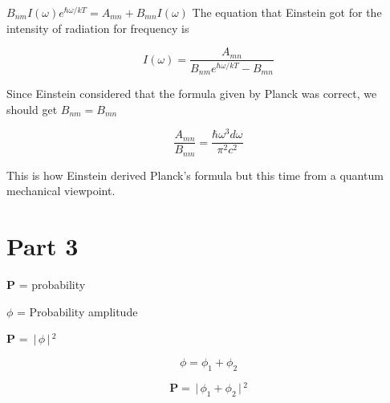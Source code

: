 \documentclass[aspectratio=169]{beamer}
\begin{document}
\begin{frame}{}

	\begin{center}

		 $ B_{nm} I(\omega) e^{\hbar \omega /kT} = A_{mn} + B_{mn} I(\omega) $ \pause \newline
		 The equation that Einstein got for the intensity of radiation for frequency is 
		
	\end{center}
	
		\begin{equation}
				 I(\omega) = \frac{A_{mn}}{B_{nm} e^{\hbar \omega / kT} - B_{mn} }	 
		\end{equation}
		
\end{frame}

\begin{frame}{}

 Since Einstein considered that the formula given by Planck was correct, we should get \pause \newline
 $ B_{nm} = B_{mn} $  \newline
		
			\begin{flushleft}
			
				 \[\frac{A_{mn}}{B_{nm}} = \frac{\hbar \omega^3 d\omega}{ \pi^2 c^2} \] 

			\end{flushleft}
			
	
\end{frame}

\begin{frame}{}
	\begin{center}
	
		{\Large This is how Einstein derived Planck's formula but this time from a quantum mechanical viewpoint.}

	\end{center}
		
\end{frame}

\section{\textbf{Part 3}}

\begin{frame}{}
\begin{multicols}{3}
 
  \textbf{P} = probability
  
	\columnbreak
	
	$ \phi $ = Probability amplitude

	\columnbreak
	
	\textbf{P} = $ \,\Bigr\rvert\,\phi \,\Bigr\rvert\,^{2} $
	
	\end{multicols}
	
			 \[ \phi  =  \phi_{1} + \phi_{2} \] 
			 
			 \[ \textbf{P} =  \,\Bigr\rvert\,\phi_{1} + \phi_{2} \,\Bigr\rvert\,^{2} \]


\end{frame}
\end{document}
